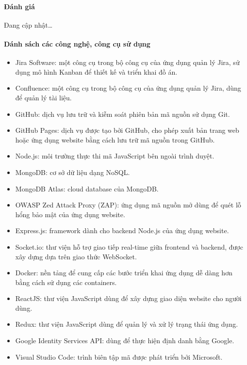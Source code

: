 \paragraph{Đánh giá}
\tab Đang cập nhật\dots

\paragraph{Dánh sách các công nghệ, công cụ sử dụng}
\begin{itemize}
    \item Jira Software: một công cụ trong bộ công cụ của ứng dụng quản lý Jira, sử dụng mô hình Kanban để thiết kế và triển khai đồ án.
    \item Confluence: một công cụ trong bộ công cụ của ứng dụng quản lý Jira, dùng để quản lý tài liệu.
    \item GitHub: dịch vụ lưu trữ và kiễm soát phiên bản mã nguồn sử dụng Git.
    \item GitHub Pages: dịch vụ được tạo bởi GitHub, cho phép xuất bản trang web hoặc ứng dụng website bằng cách lưu trữ mã nguồn trong GitHub.
    \item Node.js: môi trường thực thi mã JavaScript bên ngoài trình duyệt.
    \item MongoDB: cơ sở dữ liệu dạng NoSQL.
    \item MongoDB Atlas: cloud database của MongoDB.
    \item OWASP Zed Attack Proxy (ZAP): ứng dụng mã nguồn mở dùng để quét lỗ hổng bảo mật của ứng dụng website.
    \item Express.js: framework dành cho backend Node.js của ứng dụng website.
    \item Socket.io: thư viện hỗ trợ giao tiếp real-time giữa frontend và backend, được xây dựng dựa trên giao thức WebSocket.
    \item Docker: nền tảng để cung cấp các bước triển khai ứng dụng dễ dàng hơn bằng cách sử dụng các containers.
    \item ReactJS: thư viện JavaScript dùng để xây dựng giao diện website cho người dùng.
    \item Redux: thư viện JavaScript dùng để quản lý và xử lý trạng thái ứng dụng.
    \item Google Identity Services API: dùng để thực hiện định danh bằng Google.
    \item Visual Studio Code: trình biên tập mã được phát triển bởi Microsoft.
\end{itemize}